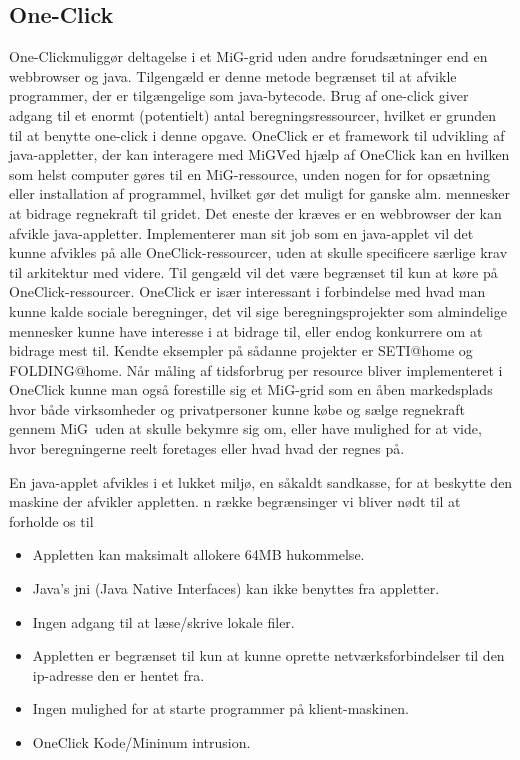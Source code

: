 \documentclass[final,a4paper,10pt]{article}
\newcommand{\mig}{MiG}
\newcommand{\oc}{One-Click}
\begin{document}
\subsection{\oc}\label{applet}
\oc muliggør deltagelse i et MiG-grid uden andre forudsætninger end en webbrowser og java. Tilgengæld er denne metode begrænset til at afvikle programmer, der er tilgængelige som java-bytecode. Brug af one-click giver adgang til et enormt (potentielt) antal beregningsressourcer, hvilket er grunden til at benytte one-click i denne opgave.
OneClick er et framework til udvikling af java-appletter, der kan interagere med \mig\. Ved hjælp af OneClick kan en hvilken som helst computer gøres til en \mig-ressource, unden nogen for for opsætning eller installation af programmel, hvilket gør det muligt for ganske alm. mennesker at bidrage regnekraft til gridet. Det eneste der kræves er en webbrowser der kan afvikle java-appletter. Implementerer man sit job som en java-applet vil det kunne afvikles på alle OneClick-ressourcer, uden at skulle specificere særlige krav til arkitektur med videre. Til gengæld vil det være begrænset til kun at køre på OneClick-ressourcer. 
OneClick er især interessant i forbindelse med hvad man kunne kalde sociale beregninger, det vil sige beregningsprojekter som almindelige mennesker kunne have interesse i at bidrage til, eller endog konkurrere om at bidrage mest til. Kendte eksempler på sådanne projekter er SETI@home og FOLDING@home. Når måling af tidsforbrug per resource bliver implementeret i OneClick kunne man også  forestille sig et \mig-grid som en åben markedsplads hvor både virksomheder og privatpersoner kunne købe og sælge regnekraft gennem \mig\ uden at skulle bekymre sig om, eller have mulighed for at vide, hvor beregningerne reelt foretages eller hvad hvad der regnes på. 


En java-applet afvikles i et lukket miljø, en såkaldt sandkasse, for at beskytte den maskine der afvikler appletten. n række begrænsinger vi bliver nødt til at forholde os til
\begin{itemize}
	\item Appletten kan maksimalt allokere 64MB hukommelse.
	\item Java's jni (Java Native Interfaces) kan ikke benyttes fra appletter. 
	\item Ingen adgang til at læse/skrive lokale filer.
	\item Appletten er begrænset til kun at kunne oprette netværksforbindelser til den ip-adresse den er hentet fra.
	\item Ingen mulighed for at starte programmer på klient-maskinen.
	\item OneClick Kode/Mininum intrusion.
\end{itemize}
\end{document}
